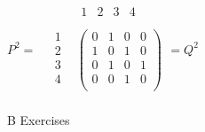 \documentclass[10pt,]{book}
\theoremstyle{plain}
\theoremstyle{definition}
\theoremstyle{definition}
\theoremstyle{definition}
\theoremstyle{definition}
\begin{document}
\begin{exercisegroup}
\begin{enumerate}[label=\alph*]
 \(P^2 =\text{  }
\begin{array}{cc}
   & 
\begin{array}{cccc}
 1 & 2 & 3 & 4 \\
\end{array}
 \\
 
\begin{array}{c}
 1 \\
 2 \\
 3 \\
 4 \\
\end{array}
 & \left(
\begin{array}{cccc}
 0 & 1 & 0 & 0 \\
 1 & 0 & 1 & 0 \\
 0 & 1 & 0 & 1 \\
 0 & 0 & 1 & 0 \\
\end{array}
\right) \\
\end{array}\)\(=Q^2\)
%
\end{enumerate}
%
\end{exercisegroup}
\par\smallskip\noindent
\hypertarget{exercisegroup-9}{}\typeout{************************************************}
\typeout{************************************************}
B Exercises%
\end{document}
